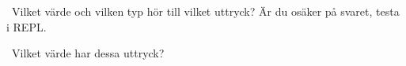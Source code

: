 \QUESTEND





\QUESTBEGIN

\Task \what~Vilket värde och vilken typ hör till vilket uttryck?  Är du osäker på svaret, testa i REPL.

\begin{ConceptConnections}[0.3\textwidth]

\end{ConceptConnections}

\SOLUTION

\TaskSolved \what

\begin{ConceptConnections}[0.3\textwidth]

\end{ConceptConnections}

\QUESTEND






\QUESTBEGIN

\Task \what~Vilket värde har dessa uttryck?  %

\Subtask {}

\Subtask {}

\Subtask {}

\Subtask {}


\Subtask {}

\Subtask {}

\Subtask {}


\Subtask {}

\Subtask {}

\Subtask {}

\SOLUTION

\TaskSolved \what

\SubtaskSolved {}

\SubtaskSolved {}

\SubtaskSolved {}

\SubtaskSolved {}


\SubtaskSolved {}

\SubtaskSolved {}

\SubtaskSolved {}


